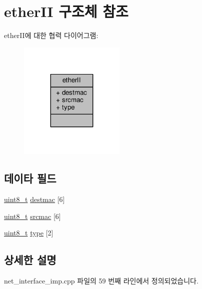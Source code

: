 \hypertarget{structavdecc__lib_1_1ether_i_i}{}\section{ether\+II 구조체 참조}
\label{structavdecc__lib_1_1ether_i_i}


ether\+I\+I에 대한 협력 다이어그램\+:
\nopagebreak
\begin{figure}[H]
\begin{center}
\leavevmode
\includegraphics[width=143pt]{structavdecc__lib_1_1ether_i_i__coll__graph}
\end{center}
\end{figure}
\subsection*{데이타 필드}
\begin{DoxyCompactItemize}
\item 
\hyperlink{stdint_8h_aba7bc1797add20fe3efdf37ced1182c5}{uint8\+\_\+t} \hyperlink{structavdecc__lib_1_1ether_i_i_a322633c436b95460687a78c149a9e274}{destmac} \mbox{[}6\mbox{]}
\item 
\hyperlink{stdint_8h_aba7bc1797add20fe3efdf37ced1182c5}{uint8\+\_\+t} \hyperlink{structavdecc__lib_1_1ether_i_i_a843681c2d2a3810fc505cd7ca30f7406}{srcmac} \mbox{[}6\mbox{]}
\item 
\hyperlink{stdint_8h_aba7bc1797add20fe3efdf37ced1182c5}{uint8\+\_\+t} \hyperlink{structavdecc__lib_1_1ether_i_i_ac74431c92cab314e7bcb4518458932a5}{type} \mbox{[}2\mbox{]}
\end{DoxyCompactItemize}


\subsection{상세한 설명}


net\+\_\+interface\+\_\+imp.\+cpp 파일의 59 번째 라인에서 정의되었습니다.



